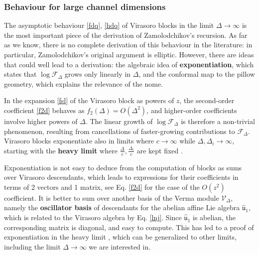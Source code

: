 \documentclass[12pt, a4paper]{article}
\newcommand{\myindex}[1]{\textbf{\boldmath #1}}
\begin{document}
\subsubsection{Behaviour for large channel dimensions} \label{sec:bld}

The asymptotic behaviour \eqref{fdq}, \eqref{hdq} of Virasoro blocks in the limit $\Delta\to\infty$ is the most important piece of the derivation of Zamolodchikov's recursion. As far as we know, there is no complete derivation of this behaviour in the literature: in particular, Zamolodchikov's original argument \cite{zam87b} is elliptic. However, there are ideas that could well lead to a derivation: the algebraic idea of \myindex{exponentiation}, which states that $\log\mathcal{F}_\Delta$ grows only linearly in $\Delta$, and the conformal map to the pillow geometry, which explains the relevance of the nome. 

In the expansion \eqref{fsl} of the Virasoro block as powers of $z$, the second-order coefficient \eqref{f2d} behaves as $f_2(\Delta)= O(\Delta^2)$, and higher-order coefficients involve higher powers of $\Delta$. 
The linear growth of $\log\mathcal{F}_\Delta$ is therefore a non-trivial phenomenon, resulting from cancellations of faster-growing contributions to $\mathcal{F}_\Delta$. Virasoro blocks exponentiate also in limits where $c\to\infty$ while $\Delta,\Delta_i\to \infty$, starting with the \myindex{heavy limit} where $\frac{\Delta}{c},\frac{\Delta_i}{c}$ are kept fixed \cite{al24}. 

Exponentiation is not easy to deduce from the computation of blocks as sums over Virasoro descendants, which leads to expressions for their coefficients in terms of 2 vectors and 1 matrix, see Eq. \eqref{f2d} for the case of the $O(z^2)$ coefficient. It is better to sum over another basis of the Verma module $\mathcal{V}_\Delta$, namely the \myindex{oscillator basis} of descendants for the abelian affine Lie algebra $\hat{\mathfrak{u}}_1$, which is related to the Virasoro algebra by Eq. \eqref{lnj}. Since $\hat{\mathfrak{u}}_1$ is abelian, the corresponding matrix is diagonal, and easy to compute. This has led to a proof of exponentiation in the heavy limit \cite{bdk19}, which can be generalized to other limits, including the limit $\Delta\to \infty$ we are interested in. 
\end{document}
